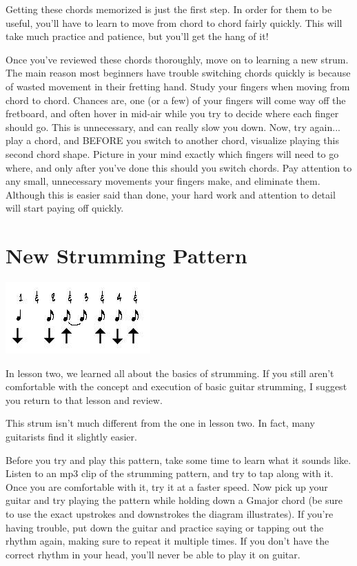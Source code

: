 Getting these chords memorized is just the first step. In order for them to be useful, you'll have to learn to move from chord to chord fairly quickly. This will take much practice and patience, but you'll get the hang of it!

Once you've reviewed these chords thoroughly, move on to learning a new strum. The main reason most beginners have trouble switching chords quickly is because of wasted movement in their fretting hand. Study your fingers when moving from chord to chord. Chances are, one (or a few) of your fingers will come way off the fretboard, and often hover in mid-air while you try to decide where each finger should go. This is unnecessary, and can really slow you down. Now, try again... play a chord, and BEFORE you switch to another chord, visualize playing this second chord shape. Picture in your mind exactly which fingers will need to go where, and only after you've done this should you switch chords. Pay attention to any small, unnecessary movements your fingers make, and eliminate them. Although this is easier said than done, your hard work and attention to detail will start paying off quickly.

\section{New Strumming Pattern}
\includegraphics{partthree/strum3.jpg}

In lesson two, we learned all about the basics of strumming. If you still aren't comfortable with the concept and execution of basic guitar strumming, I suggest you return to that lesson and review.

This strum isn't much different from the one in lesson two. In fact, many guitarists find it slightly easier.

Before you try and play this pattern, take some time to learn what it sounds like. Listen to an mp3 clip of the strumming pattern, and try to tap along with it. Once you are comfortable with it, try it at a faster speed. Now pick up your guitar and try playing the pattern while holding down a Gmajor chord (be sure to use the exact upstrokes and downstrokes the diagram illustrates). If you're having trouble, put down the guitar and practice saying or tapping out the rhythm again, making sure to repeat it multiple times. If you don't have the correct rhythm in your head, you'll never be able to play it on guitar.

